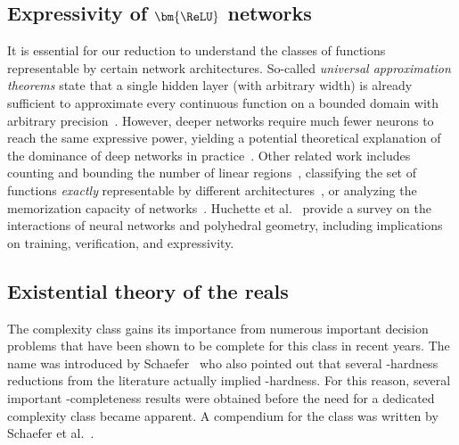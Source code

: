 \documentclass{toc}
\begin{document}
\subsection{Expressivity of \texorpdfstring{$\bm{{\ReLU}}$}{ReLU} networks}
It is essential for our reduction to understand the classes of functions representable by certain \ReLU network architectures.
So-called \emph{universal approximation theorems} state that a single hidden layer (with arbitrary width) is already sufficient to approximate every continuous function on a bounded domain with arbitrary precision~\cite{Cybenko1989_Approximation, Hornik1991_Approximation}.
However, deeper networks require much fewer neurons to reach the same expressive power, yielding a potential theoretical explanation of the dominance of deep networks in practice~\cite{Arora2018_Understanding, Eldan2016_Power, Hanin2019_Universal, Hanin2018_Approximating, Liang2017_Deep, Nguyen2018_Neural, Raghu2017_Expressive, Safran2017_Depth, Telgarsky2016_Benefits, Yarotsky2017_Error}. %
Other related work includes counting and bounding the number of linear regions~\cite{Hanin2019_Complexity, Montufar2022_Sharp, Montufar2014_Regions, Pascanu2014_Number, Raghu2017_Expressive, Serra2018_Bounding,stargalla2025computational}, classifying the set of functions \emph{exactly} representable by different architectures~\cite{Arora2018_Understanding, Dereich2022_Minimal, Haase2023_LowerBound, Hertrich2021_Towards, Hertrich2021_ReLU, Mukherjee2017_Lower, Zhang2018_Tropical,bakaev2025better}, or analyzing the memorization capacity of \ReLU networks~\cite{Vardi2022_Optimal, Yun2019_Small, Zhang2021_Understanding}.
Huchette et al.~\cite{Huchette2023_Survey} provide a survey on the interactions of neural networks and polyhedral geometry, including implications on training, verification, and expressivity.



\subsection{Existential theory of the reals}
The complexity class \ER gains its importance from numerous important 
%
decision  %
problems that have been shown to be complete for this class in recent years.
The name \ER was introduced by Schaefer~\cite{Schaefer2010_GeometryTopology} who also pointed out that several \NP-hardness reductions from the literature actually implied \ER-hardness.
For this reason, several important \ER-completeness results were obtained before the need for a dedicated complexity class became apparent. A compendium for the class \ER was written by Schaefer et al.~\cite{schaefer2024existential}.
\end{document}
